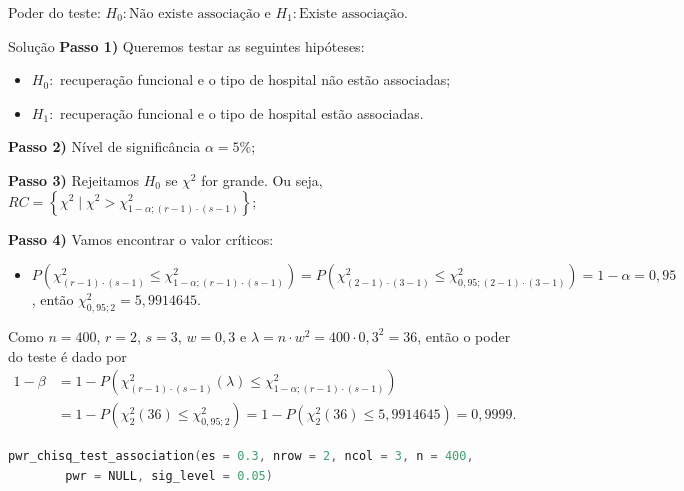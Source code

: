 \documentclass[9pt]{beamer}
\begin{document}
\begin{frame}[fragile]{Poder do teste: $H_0:\mbox{Não existe associação}$ e $H_1:\mbox{Existe associação} $.}

\scriptsize
\begin{block}{Solução}
	\textbf{Passo 1)} Queremos testar as seguintes hipóteses:
	\begin{itemize}
		\item $H_0:$ recuperação funcional e o tipo de hospital não estão associadas;
		\item $H_1:$ recuperação funcional e o tipo de hospital estão associadas.
	\end{itemize}

	\textbf{Passo 2)} Nível de significância $\alpha=5\%$;
	
	\textbf{Passo 3)} Rejeitamos $H_0$ se $\chi^2$ for grande. Ou seja, $RC =\left\{ \chi^2 \mid \chi^2 > \chi^2_{1-\alpha; (r-1)\cdot (s-1)} \right\}$;
	
	\textbf{Passo 4)} Vamos encontrar o valor críticos:
	\begin{itemize}
		\item $P\left( \chi^2_{(r-1)\cdot (s-1)} \leq \chi^2_{1-\alpha;(r-1)\cdot (s-1)} \right) = P\left( \chi^2_{(2-1)\cdot (3-1)} \leq \chi^2_{0,95;(2-1)\cdot (3-1)} \right) = \allowbreak 1-\alpha=0,95$, então $\chi^2_{0,95;2} = 5,9914645$.
	\end{itemize}

	Como $n=400$, $r=2$, $s=3$, $w=0,3$ e $\lambda = n \cdot w^2 = 400 \cdot 0,3^2 = 36$, então o poder do teste é dado por
	\begin{align*}
		1-\beta &= 1 - P\left( \chi_{(r-1)\cdot (s-1)}^2(\lambda) \leq \chi_{1-\alpha; (r-1)\cdot (s-1)}^2 \right)\\
		&= 1 - P\left( \chi_{2}^2(36) \leq \chi_{0,95; 2}^2 \right) = 1 - P\left( \chi_{2}^2(36) \leq 5,9914645 \right) = 0,9999.
	\end{align*}
\end{block}

\begin{lstlisting}[language = C, caption = Código no R.]
pwr_chisq_test_association(es = 0.3, nrow = 2, ncol = 3, n = 400,
		pwr = NULL, sig_level = 0.05)
\end{lstlisting}

\normalsize

\end{frame}
\end{document}
